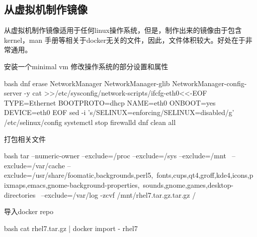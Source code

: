 \subsection{从虚拟机制作镜像}
从虚拟机制作镜像适用于任何linux操作系统，但是，制作出来的镜像由于包含kernel，man
手册等相关于docker无关的文件，因此，文件体积较大。好处在于非常通用。
\begin{outline}[enumerate]
  \1 安装一个minimal vm
  \1 修改操作系统的部分设置和属性
\begin{code-block}{bash}
dnf erase NetworkManager NetworkManager-glib NetworkManager-config-server -y
cat >>/etc/sysconfig/network-scripts/ifcfg-eth0<<-EOF
TYPE=Ethernet
BOOTPROTO=dhcp
NAME=eth0
ONBOOT=yes
DEVICE=eth0
EOF
sed -i 's/SELINUX=enforcing/SELINUX=disabled/g' /etc/selinux/config
systemctl stop firewalld
dnf clean all
\end{code-block}

  \1 打包相关文件
\begin{code-block}{bash}
tar --numeric-owner --exclude=/proc --exclude=/sys --exclude=/mnt \
    --exclude=/var/cache --exclude=/usr/share/{foomatic,backgrounds,perl5,\
    fonts,cups,qt4,groff,kde4,icons,pixmaps,emacs,gnome-background-properties,\
    sounds,gnome,games,desktop-directories}  \
    --exclude=/var/log -zcvf /mnt/rhel7.tar.gz.tar.gz /
\end{code-block}

  \1 导入docker repo
\begin{code-block}{bash}
cat rhel7.tar.gz | docker import - rhel7
\end{code-block}

\end{outline}

